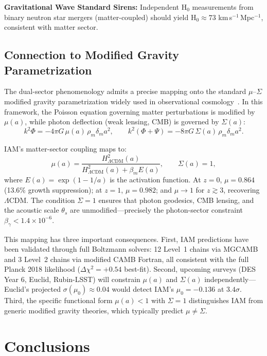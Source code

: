 \documentclass[twocolumn,superscriptaddress,prd,amsmath,amssymb]{revtex4-2}
\begin{document}
\textbf{Gravitational Wave Standard Sirens:} Independent H$_0$ measurements from binary neutron star mergers (matter-coupled) should yield H$_0 \approx 73$ km\,s$^{-1}$\,Mpc$^{-1}$, consistent with matter sector.

\subsection{Connection to Modified Gravity Parametrization}

The dual-sector phenomenology admits a precise mapping onto the standard $\mu$--$\Sigma$ modified gravity parametrization widely used in observational cosmology~\cite{Amendola2020}. In this framework, the Poisson equation governing matter perturbations is modified by $\mu(a)$, while photon deflection (weak lensing, CMB) is governed by $\Sigma(a)$:
\begin{equation}
k^2 \Phi = -4\pi G\, \mu(a)\, \rho_m \delta_m a^2, \qquad k^2(\Phi + \Psi) = -8\pi G\, \Sigma(a)\, \rho_m \delta_m a^2.
\end{equation}

IAM's matter-sector coupling maps to:
\begin{equation}
\mu(a) = \frac{H^2_{\Lambda\text{CDM}}(a)}{H^2_{\Lambda\text{CDM}}(a) + \beta_m E(a)}, \qquad \Sigma(a) = 1,
\end{equation}
where $E(a) = \exp(1 - 1/a)$ is the activation function. At $z = 0$, $\mu = 0.864$ (13.6\% growth suppression); at $z = 1$, $\mu = 0.982$; and $\mu \to 1$ for $z \gtrsim 3$, recovering $\Lambda$CDM. The condition $\Sigma = 1$ ensures that photon geodesics, CMB lensing, and the acoustic scale $\theta_s$ are unmodified—precisely the photon-sector constraint $\beta_\gamma < 1.4 \times 10^{-6}$.

This mapping has three important consequences. First, IAM predictions have been validated through full Boltzmann solvers: 12 Level~1 chains via MGCAMB and 3 Level~2 chains via modified CAMB Fortran, all consistent with the full Planck 2018 likelihood ($\Delta\chi^2 = +0.54$ best-fit). Second, upcoming surveys (DES Year 6, Euclid, Rubin-LSST) will constrain $\mu(a)$ and $\Sigma(a)$ independently---Euclid's projected $\sigma(\mu_0) \approx 0.04$ would detect IAM's $\mu_0 = -0.136$ at $3.4\sigma$. Third, the specific functional form $\mu(a) < 1$ with $\Sigma = 1$ distinguishes IAM from generic modified gravity theories, which typically predict $\mu \neq \Sigma$.

\section{Conclusions}
\end{document}

